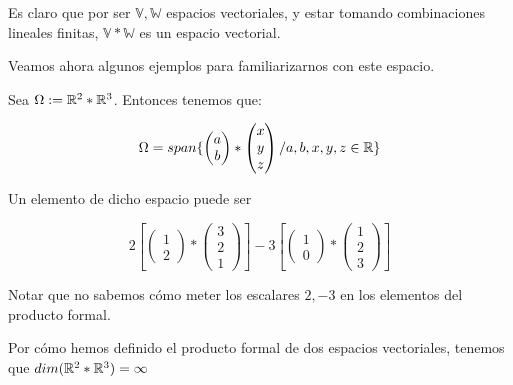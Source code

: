 Es claro que por ser $\mathbb{V}, \mathbb{W}$ espacios vectoriales, y estar tomando combinaciones lineales finitas, $\mathbb{V} \ast \mathbb{W}$ es un espacio vectorial.

Veamos ahora algunos ejemplos para familiarizarnos con este espacio.

\begin{ejemplo} \label{ej:prod_formal}

Sea $\Omega := \mathbb{R}^2 \ast \mathbb{R}^3$. Entonces tenemos que:

\begin{equation}
    \Omega = span \{
        \begin{pmatrix}
            a \\
            b
        \end{pmatrix}
        \ast
        \begin{pmatrix}
            x \\
            y \\
            z
        \end{pmatrix}
        / a, b, x, y, z \in \mathbb{R}
    \}
\end{equation}

Un elemento de dicho espacio puede ser

$$
2 \left[ \begin{pmatrix}1 \\ 2\end{pmatrix} \ast \begin{pmatrix}3 \\ 2 \\ 1 \end{pmatrix} \right]
- 3 \left[ \begin{pmatrix}1 \\ 0\end{pmatrix} \ast \begin{pmatrix}1 \\ 2 \\ 3 \end{pmatrix} \right]
$$

Notar que no sabemos cómo meter los escalares $2, -3$ en los elementos del producto formal.

Por cómo hemos definido el producto formal de dos espacios vectoriales, tenemos que $dim(\mathbb{R}^2 \ast \mathbb{R}^3) = \infty$

\end{ejemplo}

